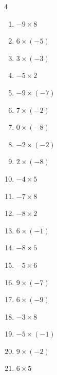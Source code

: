 \begin{multicols}{4}
\begin{enumerate}
  \item $-9\times 8$
        \phantom{$=-72$}

  \item $6\times (-5)$
        \phantom{$=-30$}

  \item $3\times (-3)$
        \phantom{$=-9$}

  \item $-5\times 2$
        \phantom{$=-10$}

  \item $-9\times (-7)$
        \phantom{$=63$}

  \item $7\times (-2)$
        \phantom{$=-14$}

  \item $0\times (-8)$
        \phantom{$=0$}

  \item $-2\times (-2)$
        \phantom{$=4$}

  \item $2\times (-8)$
        \phantom{$=-16$}

  \item $-4\times 5$
        \phantom{$=-20$}

  \item $-7\times 8$
        \phantom{$=-56$}

  \item $-8\times 2$
        \phantom{$=-16$}

  \item $6\times (-1)$
        \phantom{$=-6$}

  \item $-8\times 5$
        \phantom{$=-40$}

  \item $-5\times 6$
        \phantom{$=-30$}

  \item $9\times (-7)$
        \phantom{$=-63$}

  \item $6\times (-9)$
        \phantom{$=-54$}

  \item $-3\times 8$
        \phantom{$=-24$}

  \item $-5\times (-1)$
        \phantom{$=5$}

  \item $9\times (-2)$
        \phantom{$=-18$}

  \item $6\times 5$
        \phantom{$=30$}


\end{enumerate}
\end{multicols}
